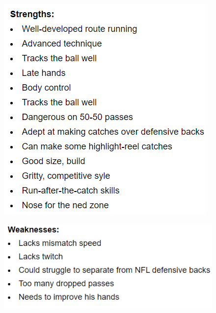 \documentclass[oneside,12pt]{Classes/RoboticsLaTeX}
\begin{document}
\begin{figure}[hb]
  \centering
  \begin{minipage}{.5\textwidth}
    \centering
    \includegraphics[width=.8\linewidth]{Figures/Bateman_Strengths.png}
    \label{fig:bateman_s}
  \end{minipage}%
  \begin{minipage}{.5\textwidth}
    \centering
    \includegraphics[width=.8\linewidth]{Figures/Bateman_Weaknesses.png}
    \label{fig:bateman_w}
  \end{minipage}
  \end{figure}
\end{document}
